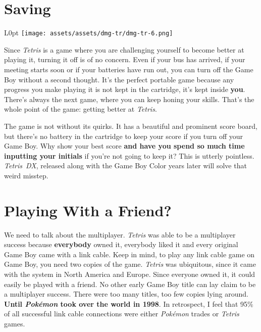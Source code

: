 \documentclass{book}
\begin{document}
\FloatBarrier\needspace{5pt}\section*{Saving}\nopagebreak[4]

\begin{wrapfigure}{L}{0pt} \texttt{[image: assets/assets/dmg-tr/dmg-tr-6.png]}\end{wrapfigure}
Since \emph{Tetris} is a game where you are challenging yourself to become better at playing it, turning it off is of no concern. Even if your bus has arrived, if your meeting starts soon or if your batteries have run out, you can turn off the Game Boy without a second thought. It’s the perfect portable game because any progress you make playing it is not kept in the cartridge, it’s kept inside \textbf{you}. There’s always the next game, where you can keep honing your skills. That’s the whole point of the game: getting better at \emph{Tetris}.

The game is not without its quirks. It has a beautiful and prominent score board, but there’s no battery in the cartridge to keep your score if you turn off your Game Boy. Why show your best score \textbf{and have you spend so much time inputting your initials} if you’re not going to keep it? This is utterly pointless. \emph{Tetris DX}, released along with the Game Boy Color years later will solve that weird misstep.

\FloatBarrier\needspace{5pt}\section*{Playing With a Friend?}\nopagebreak[4]

We need to talk about the multiplayer. \emph{Tetris} was able to be a multiplayer success because \textbf{everybody} owned it, everybody liked it and every original Game Boy came with a link cable. Keep in mind, to play any link cable game on Game Boy, you need two copies of the game. \emph{Tetris} was ubiquitous, since it came with the system in North America and Europe. Since everyone owned it, it could easily be played with a friend. No other early Game Boy title can lay claim to be a multiplayer success. There were too many titles, too few copies lying around. \textbf{Until \emph{Pokémon} took over the world in 1998}. In retrospect, I feel that 95\% of all successful link cable connections were either \emph{Pokémon} trades or \emph{Tetris} games.
\end{document}
